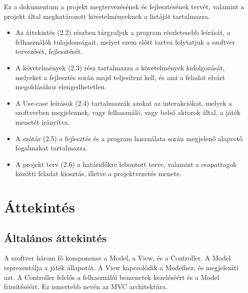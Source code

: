 Ez a dokumentum a projekt megtervezésének és fejlesztésének tervét, valamint a projekt által meghatározott követelményeknek a listáját tartalmazza.
\begin{itemize}
\item Az áttekintés (2.2) részben tárgyaljuk a program részletesebb leírását, a felhasználók tulajdonságait, melyet szem előtt tartva folytatjuk a szoftver tervezését, fejlesztését.
\item A követelmények (2.3) rész tartalmazza a követelmények kidolgozását, melyeket a fejlesztés során majd teljesíteni kell, és ami a feladat elvárt megoldásához elengedhetetlen.
\item A Use-case leírások (2.4) tartalmazzák azokat az interakciókat, melyek a szoftverben megjelennek, vagy felhasználó, vagy belső aktorok által, a játék menetét irányítva.
\item A szótár (2.5) a fejlesztés és a program használata során megjelenő alapvető fogalmakat tartalmazza.
\item A projekt terv (2.6) a határidőkre lebontott terve, valamint a csapattagok közötti feladat kiosztás, illetve a projektvezetés menete.
\end{itemize}
\section{Áttekintés}
\subsection{Általános áttekintés}
A szoftver három fő komponense a Model, a View, és a Controller. A Model reprezentálja a játék állapotát. A View kapcsolódik a Modelhez, és megjeleníti azt. A Controller felelős a felhasználói bemenetek kezeléséért és a Model frissítéséért. Ez ismertebb nevén az MVC architektúra.

